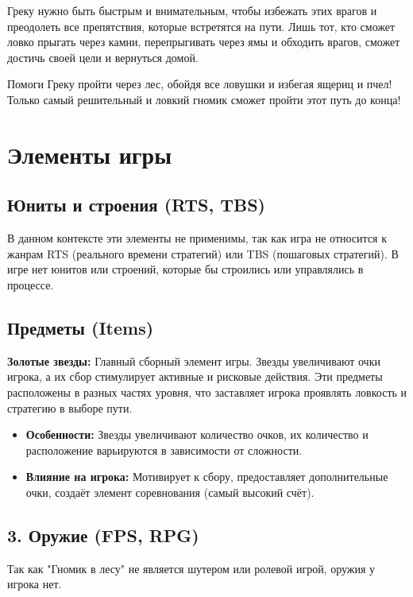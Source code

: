 \documentclass{article}
\begin{document}
Греку нужно быть быстрым и внимательным, чтобы избежать этих врагов и преодолеть все препятствия, которые встретятся на пути. Лишь тот, кто сможет ловко прыгать через камни, перепрыгивать через ямы и обходить врагов, сможет достичь своей цели и вернуться домой.

Помоги Греку пройти через лес, обойдя все ловушки и избегая ящериц и пчел! Только самый решительный и ловкий гномик сможет пройти этот путь до конца!


\section{Элементы игры}

\subsection{Юниты и строения (RTS, TBS)}
В данном контексте эти элементы не применимы, так как игра не относится к жанрам RTS (реального времени стратегий) или TBS (пошаговых стратегий). В игре нет юнитов или строений, которые бы строились или управлялись в процессе.

\subsection{Предметы (Items)}
\textbf{Золотые звезды:} Главный сборный элемент игры. Звезды увеличивают очки игрока, а их сбор стимулирует активные и рисковые действия. Эти предметы расположены в разных частях уровня, что заставляет игрока проявлять ловкость и стратегию в выборе пути.
\begin{itemize}
    \item \textbf{Особенности:} Звезды увеличивают количество очков, их количество и расположение варьируются в зависимости от сложности.
    \item \textbf{Влияние на игрока:} Мотивирует к сбору, предоставляет дополнительные очки, создаёт элемент соревнования (самый высокий счёт).
\end{itemize}

\subsection{3. Оружие (FPS, RPG)}
Так как "Гномик в лесу" не является шутером или ролевой игрой, оружия у игрока нет.
\end{document}
